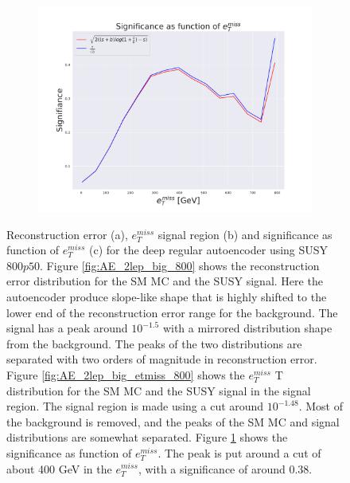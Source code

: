 \begin{figure}[h!]
    \begin{subfigure}{.49\textwidth}
        \includegraphics[width=\textwidth]{Figures/AE_testing/big/2lep/significance_etmiss_800p0p050_-1.4833711230716062.pdf}
        \caption{}
        \label{fig:AE_2lep_big_signi_800}
    \end{subfigure}
    \hfill      
    \caption[2lep deep network | $800p50$ | AE]{Reconstruction error (a), $e_T^{miss}$ signal region (b) and significance as function of 
    $e_T^{miss}$ (c) for the deep regular autoencoder using SUSY $800p50$. 
    Figure \ref{fig:AE_2lep_big_800} shows the reconstruction error distribution for the SM MC and the SUSY signal. 
Here the autoencoder produce slope-like shape that is highly shifted to the lower end of the reconstruction error range
for the background. The signal has a peak around $10^{-1.5}$ with a mirrored distribution shape from the background. The peaks of the two distributions are separated
with two orders of magnitude in reconstruction error. Figure \ref{fig:AE_2lep_big_etmiss_800} shows the $e_T^{miss}$
T distribution for the SM MC and the SUSY signal in the signal region. The signal region is made using a cut around
$10^{-1.48}$. Most of the background is removed, and the peaks of the SM MC and signal distributions are
somewhat separated.  Figure \ref{fig:AE_2lep_big_signi_800} shows the significance as function of $e_T^{miss}$. The peak is put 
around a cut of about 400 GeV in the $e_T^{miss}$, with a significance of around $0.38$.}
    \label{fig:AE_2lep_big_rec_sig_signi_800}
\end{figure}

